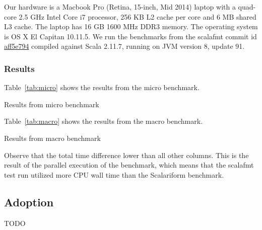 Our hardware is a Macbook Pro (Retina, 15-inch, Mid 2014) laptop with a quad-core 2.5 GHz Intel Core i7 processor, 256 KB L2 cache per core and 6 MB shared L3 cache.
The laptop has 16 GB 1600 MHz DDR3 memory.
The operating system is OS X El Capitan 10.11.5.
We run the benchmarks from the scalafmt commit id \href{https://github.com/olafurpg/scalafmt/tree/aff5e794dae4787b08243f8abb87a3ca4d907e40}{aff5e794} compiled against Scala 2.11.7, running on JVM version 8, update 91.

\subsubsection{Results}
Table~\ref{tab:micro} shows the results from the micro benchmark.
\begin{table}\label{tab:micro}
  \centering
  \caption{Results from micro benchmark}
\end{table}

Table~\ref{tab:macro} shows the results from the macro benchmark.
\begin{table}[H]
  \centering
  
  \caption{Results from macro benchmark}\label{tab:macro}
\end{table}
Observe that the total time difference lower than all other columns.
This is the result of the parallel execution of the benchmark, which means that the scalafmt test run utilized more CPU wall time than the Scalariform benchmark.



\subsection{Adoption}\label{sec:adoption}
TODO


